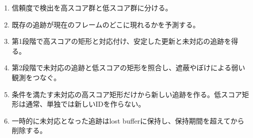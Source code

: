 \documentclass[11pt,a4paper,oneside]{report}
\begin{document}
\begin{plainBox}
\begin{enumerate}[label=\textbf{手順\arabic*：},leftmargin=5.2em,itemsep=.35em]
  \item 信頼度で検出を高スコア群と低スコア群に分ける。
  \item 既存の追跡が現在のフレームのどこに現れるかを予測する。
  \item 第1段階で高スコアの矩形と対応付け、安定した更新と未対応の追跡を得る。
  \item 第2段階で未対応の追跡と低スコアの矩形を照合し、遮蔽やぼけによる弱い観測をつなぐ。
  \item 条件を満たす未対応の高スコア矩形だけから新しい追跡を作る。低スコア矩形は通常、単独では新しいIDを作らない。
  \item 一時的に未対応となった追跡はlost bufferに保持し、保持期間を超えてから削除する。
\end{enumerate}
\end{plainBox}
\end{document}
